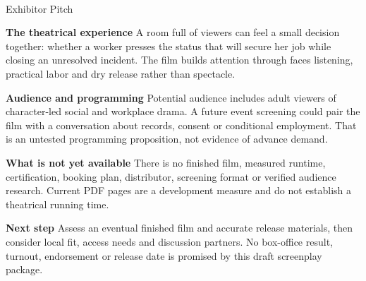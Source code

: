 \documentclass[11pt,letterpaper]{article}
\begin{document}
\begin{center}
{\Large\bfseries\sffamily \filmtitleupper}\\[6pt]
Exhibitor Pitch
\end{center}
\textbf{The theatrical experience} A room full of viewers can feel a small decision together: whether a worker presses the status that will secure her job while closing an unresolved incident. The film builds attention through faces listening, practical labor and dry release rather than spectacle.

\textbf{Audience and programming} Potential audience includes adult viewers of character-led social and workplace drama. A future event screening could pair the film with a conversation about records, consent or conditional employment. That is an untested programming proposition, not evidence of advance demand.

\textbf{What is not yet available} There is no finished film, measured runtime, certification, booking plan, distributor, screening format or verified audience research. Current PDF pages are a development measure and do not establish a theatrical running time.

\textbf{Next step} Assess an eventual finished film and accurate release materials, then consider local fit, access needs and discussion partners. No box-office result, turnout, endorsement or release date is promised by this draft screenplay package.
\end{document}
